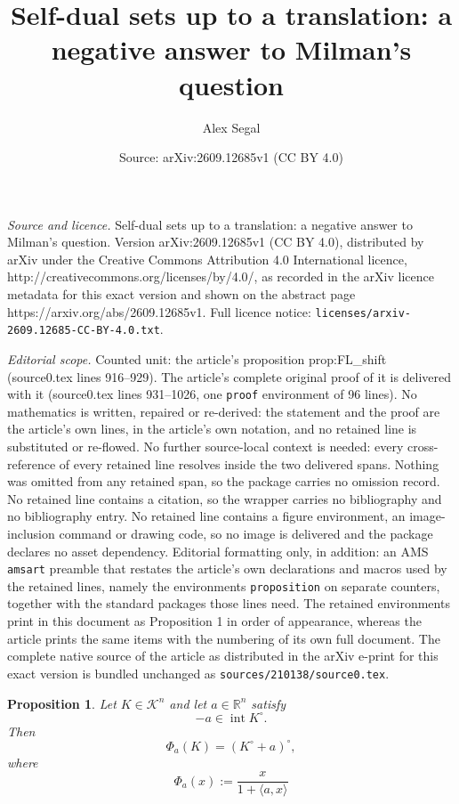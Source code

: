 \documentclass[10pt,a4paper]{amsart}
\title{Self-dual sets up to a translation: a negative answer to Milman's question}
\author{Alex Segal}
\date{Source: arXiv:2609.12685v1 (CC BY 4.0)}
\newtheorem{proposition}{Proposition}
\newcommand{\Kn}{\mathcal{K}^n}
\begin{document}
\maketitle

\noindent\emph{Source and licence.} Self-dual sets up to a translation: a negative answer to Milman's question. Version arXiv:2609.12685v1 (CC BY 4.0), distributed by arXiv under the Creative Commons Attribution 4.0 International licence, http://creativecommons.org/licenses/by/4.0/, as recorded in the arXiv licence metadata for this exact version and shown on the abstract page https://arxiv.org/abs/2609.12685v1. Full licence notice: \texttt{licenses/arxiv-2609.12685-CC-BY-4.0.txt}.\par\smallskip

\noindent\textit{Editorial scope.} Counted unit: the article's proposition prop:FL\_shift (source0.tex lines 916--929). The article's complete original proof of it is delivered with it (source0.tex lines 931--1026, one \texttt{proof} environment of 96 lines). No mathematics is written, repaired or re-derived: the statement and the proof are the article's own lines, in the article's own notation, and no retained line is substituted or re-flowed.  No further source-local context is needed: every cross-reference of every retained line resolves inside the two delivered spans.  Nothing was omitted from any retained span, so the package carries no omission record.  No retained line contains a citation, so the wrapper carries no bibliography and no bibliography entry.  No retained line contains a figure environment, an image-inclusion command or drawing code, so no image is delivered and the package declares no asset dependency.  Editorial formatting only, in addition: an AMS \texttt{amsart} preamble that restates the article's own declarations and macros used by the retained lines, namely the environments \texttt{proposition} on separate counters, together with the standard packages those lines need.  The retained environments print in this document as Proposition 1 in order of appearance, whereas the article prints the same items with the numbering of its own full document.  The complete native source of the article as distributed in the arXiv e-print for this exact version is bundled unchanged as \texttt{sources/210138/source0.tex}.
\begin{proposition} \label{prop:FL_shift}
Let \(K \in \Kn\) and let \(a\in\mathbb R^n\) satisfy
\[
-a\in\operatorname{int}K^\circ.
\]Then
\[
\Phi_a(K)=(K^\circ+a)^\circ,
\]
where 
\[
\Phi_a(x):=\frac{x}{1+\langle a,x\rangle}
\]

\end{proposition}
\end{document}
